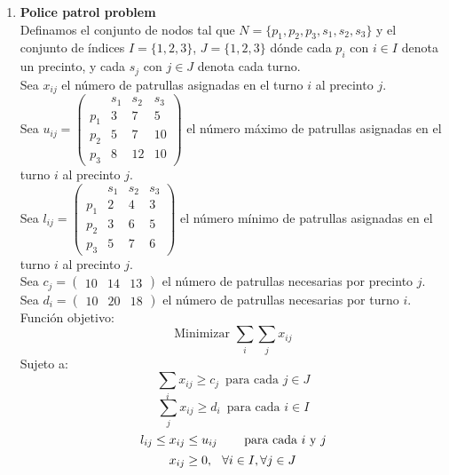 \documentclass[a4paper, 12pt]{article}
\begin{document}
\begin{enumerate}
      \item {\bfseries Police patrol problem }
            \\ Definamos el conjunto de nodos tal que $N = \{ p_1,p_2,p_3,s_1,s_2,s_3 \}$ y el conjunto de índices $I= \{1,2,3\}$, $J= \{1,2,3\}$ dónde cada $p_i$ con $i \in I$ denota un precinto, y cada $s_j$ con $j \in J$ denota cada turno.
            \\ Sea $x_{ij}$ el número de patrullas asignadas en el turno $i$ al precinto $j$.
            \\ Sea $u_{ij} = \begin{pmatrix} &s_1&s_2&s_3\\ p_1&3&7&5 \\ p_2&5&7&10 \\ p_3&8&12&10 \end{pmatrix}$ el número máximo de patrullas asignadas en el turno $i$ al precinto $j$.
            \\ Sea $l_{ij} = \begin{pmatrix} &s_1&s_2&s_3\\p_1&2&4&3 \\ p_2&3&6&5 \\ p_3&5&7&6 \end{pmatrix}$ el número mínimo de patrullas asignadas en el turno $i$ al precinto $j$.
            \\ Sea $c_j = \begin{pmatrix} 10 & 14 & 13 \end{pmatrix}$ el número de patrullas necesarias por precinto $j$.
            \\ Sea $d_i = \begin{pmatrix} 10 & 20 & 18 \end{pmatrix}$ el número de patrullas necesarias por turno $i$.
            \\ Función objetivo:
            \[\text{Minimizar } \sum_i \sum_j x_{ij} \]
            Sujeto a:
            \[ \sum_{i}  {x_{ij}} \geq c_j \, \text{ para cada } j \in J\]
            \[ \sum_{j} {x_{ij}} \geq d_i \, \text{ para cada } i \in I\]
            \[ l_{ij}\leq x_{ij} \leq u_{ij} \hspace{0.3in} \text{para cada } i \text{ y } j\]
            \[ x_{ij} \geq 0, \hspace{0.1in} \forall i \in I, \forall j \in J \]


            \begin{center}
\end{center}
\end{enumerate}
\end{document}

